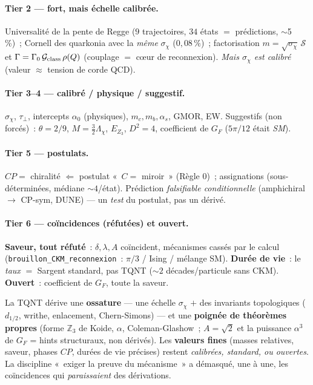 \documentclass[11pt]{article}
\begin{document}
\paragraph{Tier 2 --- fort, mais échelle calibrée.} Universalité de la pente de Regge ($9$
trajectoires, $34$ états $=$ prédictions, $\sim$5\,\%)~; Cornell des quarkonia avec la \emph{même}
$\sigma_\chi$ ($0{,}08\,\%$)~; factorisation $m=\sqrt{\sigma_\chi}\,\mathcal{S}$ et
$\Gamma=\Gamma_0\,\mathcal{G}_{\rm class}\,\rho(Q)$ (couplage $=$ cœur de reconnexion). \emph{Mais
$\sigma_\chi$ est calibré} (valeur $\approx$ tension de corde QCD).

\paragraph{Tier 3--4 --- calibré / physique / suggestif.} $\sigma_\chi$, $\tau_\perp$, intercepts
$\alpha_0$ (physiques), $m_c,m_b,\alpha_s$, GMOR, EW. Suggestifs (non forcés)~: $\theta{=}2/9$,
$M{=}\tfrac32\Lambda_\chi$, $E_{Z_3}$, $D^2{=}4$, coefficient de $G_F$ ($5\pi/12$ était \emph{SM}).

\paragraph{Tier 5 --- postulats.} $CP=$ chiralité $\Leftarrow$ postulat «~$C=$ miroir~» (Règle 0)~;
assignations (sous-déterminées, médiane $\sim4$/état). Prédiction \emph{falsifiable conditionnelle}
(amphichiral $\to$ CP-sym, DUNE) --- un \emph{test} du postulat, pas un dérivé.

\paragraph{Tier 6 --- coïncidences (réfutées) et ouvert.} \textbf{Saveur, tout réfuté}~:
$\delta,\lambda,A$ coïncident, mécanismes cassés par le calcul (\texttt{brouillon\_CKM\_reconnexion}~:
$\pi/3$ / Ising / mélange SM). \textbf{Durée de vie}~: le \emph{taux} $=$ Sargent standard, pas TQNT
($\sim2$ décades/particule sans CKM). \textbf{Ouvert}~: coefficient de $G_F$, toute la saveur.

\begin{tcolorbox}[colback=blue!5,colframe=blue!50!black,title=Verdict en une phrase]
La TQNT dérive une \textbf{ossature} --- une échelle $\sigma_\chi$ $+$ des invariants topologiques
($d_{1/2}$, writhe, enlacement, Chern-Simons) --- et une \textbf{poignée de théorèmes propres}
(forme $\mathbb{Z}_3$ de Koide, $\alpha$, Coleman-Glashow~; $A{=}\sqrt2$ et la puissance $\alpha^3$ de $G_F$ = hints structuraux, non dérivés). Les \textbf{valeurs fines}
(masses relatives, saveur, phases $CP$, durées de vie précises) restent \emph{calibrées, standard,
ou ouvertes}. La discipline «~exiger la preuve du mécanisme~» a démasqué, une à une, les
coïncidences qui \emph{paraissaient} des dérivations.
\end{tcolorbox}
\end{document}
